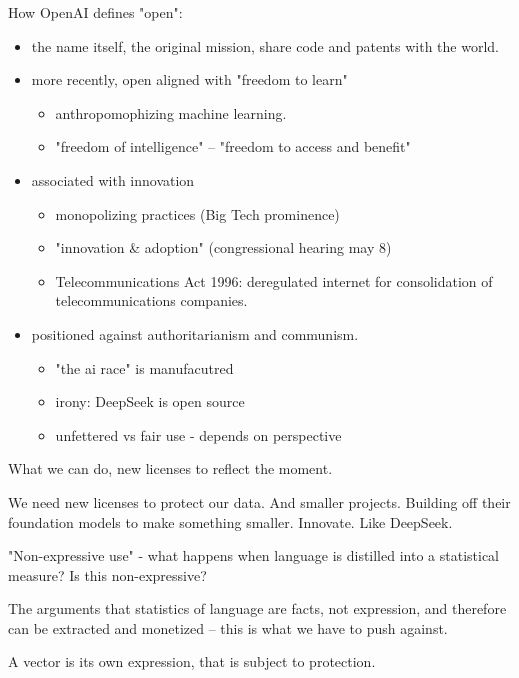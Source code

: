 \documentclass[11pt]{article}
\begin{document}
How OpenAI defines "open":
\begin{itemize}
\item the name itself, the original mission, share code and patents with
the world.
\item more recently, open aligned with "freedom to learn"
\begin{itemize}
\item anthropomophizing machine learning.
\item "freedom of intelligence" -- "freedom to access and benefit"
\end{itemize}
\item associated with innovation
\begin{itemize}
\item monopolizing practices (Big Tech prominence)
\item "innovation \& adoption" (congressional hearing may 8)
\item Telecommunications Act 1996: deregulated internet for
consolidation of telecommunications companies.
\end{itemize}
\item positioned against authoritarianism and communism.
\begin{itemize}
\item "the ai race" is manufacutred
\item irony: DeepSeek is open source
\item unfettered vs fair use - depends on perspective
\end{itemize}
\end{itemize}

What we can do, new licenses to reflect the moment.

We need new licenses to protect our data. And smaller projects.
Building off their foundation models to make something smaller.
Innovate. Like DeepSeek.

"Non-expressive use" - what happens when language is distilled into a
statistical measure? Is this non-expressive?

The arguments that statistics of language are facts, not expression,
and therefore can be extracted and monetized -- this is what we have
to push against.

A vector is its own expression, that is subject to protection. 
\end{document}

